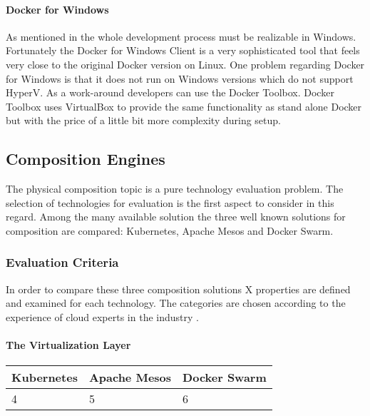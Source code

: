 \paragraph{Docker for Windows}

As mentioned in  the whole \og{} development
process must be realizable in Windows. Fortunately the Docker for Windows Client
is a very sophisticated tool that feels very close to the original Docker
version on Linux. One problem regarding Docker for Windows is that it does not
run on Windows versions which do not support HyperV. As a work-around developers
can use the Docker Toolbox. Docker Toolbox uses VirtualBox to provide the
same functionality as stand alone Docker but with the price of a little bit more
complexity during setup.

\subsection{Composition Engines}
\label{sub:composition_engines}

The physical \ms{} composition topic is a pure technology evaluation problem.
The selection of technologies for evaluation is the first aspect to consider in
this regard. Among the many available solution the three well known solutions
for \ms{} composition are compared: Kubernetes, Apache Mesos and Docker Swarm.

\subsubsection{Evaluation Criteria}

In order to compare these three composition solutions X properties are defined
and examined for each technology. The categories are chosen according to the
experience of cloud experts in the industry \cite{toll2016cloud_expert_eval}
\cite{lerilli2012cloud_eval_criteria} \cite{voras2011evaluating}.

\paragraph{The Virtualization Layer}

\begin{center}
  \begin{tabular}{ | p{4.2cm} | p{4.2cm} | p{4.2cm} | }
    \hline
    \textbf{Kubernetes}&\textbf{Apache Mesos}&\textbf{Docker Swarm}\\\hline
    4 & 5 & 6 \\
    \hline
  \end{tabular}
\end{center}

